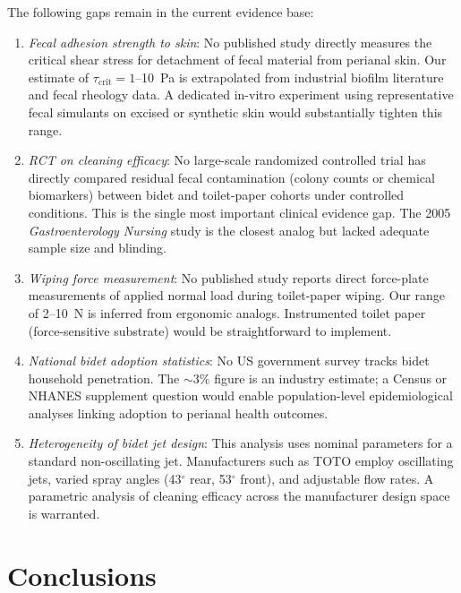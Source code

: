 \documentclass[aps,prfluids,reprint,amsmath,amssymb,floatfix]{revtex4-2}
\begin{document}
The following gaps remain in the current evidence base:

\begin{enumerate}[leftmargin=*, label=(\roman*)]
    \item \emph{Fecal adhesion strength to skin}: No published study directly
    measures the critical shear stress for detachment of fecal material from
    perianal skin. Our estimate of $\tau_\mathrm{crit} = 1$--\SI{10}{Pa} is
    extrapolated from industrial biofilm literature and fecal rheology data.
    A dedicated in-vitro experiment using representative fecal simulants on
    excised or synthetic skin would substantially tighten this range.
    \item \emph{RCT on cleaning efficacy}: No large-scale randomized
    controlled trial has directly compared residual fecal contamination
    (colony counts or chemical biomarkers) between bidet and toilet-paper
    cohorts under controlled conditions. This is the single most important
    clinical evidence gap. The 2005 \textit{Gastroenterology Nursing} study
    is the closest analog but lacked adequate sample size and blinding.
    \item \emph{Wiping force measurement}: No published study reports direct
    force-plate measurements of applied normal load during toilet-paper wiping.
    Our range of 2--\SI{10}{N} is inferred from ergonomic analogs. Instrumented
    toilet paper (force-sensitive substrate) would be straightforward to
    implement.
    \item \emph{National bidet adoption statistics}: No US government survey
    tracks bidet household penetration. The $\sim3\%$ figure is an industry
    estimate; a Census or NHANES supplement question would enable population-level
    epidemiological analyses linking adoption to perianal health outcomes.
    \item \emph{Heterogeneity of bidet jet design}: This analysis uses
    nominal parameters for a standard non-oscillating jet. Manufacturers
    such as TOTO employ oscillating jets, varied spray angles (43$^\circ$ rear,
    53$^\circ$ front), and adjustable flow rates. A parametric analysis of
    cleaning efficacy across the manufacturer design space is warranted.
\end{enumerate}

\section{Conclusions}
\label{sec:conclusion}
\end{document}
